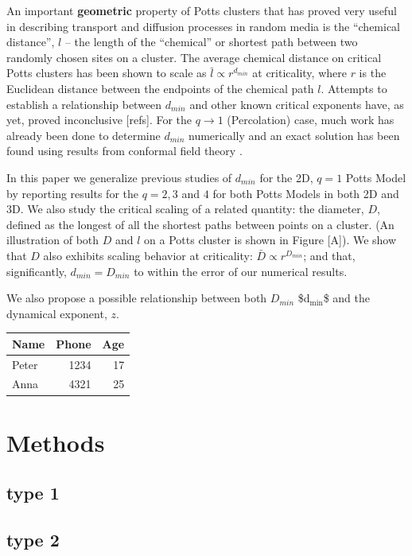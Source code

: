 \documentclass{article}
\begin{document}
An important \textbf{geometric} property of Potts clusters that has proved very useful in describing transport and diffusion processes in random media is the ``chemical distance'', $l$ -- the length of the ``chemical'' or shortest path between two randomly chosen sites on a cluster.  The average chemical distance on critical Potts clusters has been shown to scale as $\bar{l} \propto r^{d_{min}}$ at criticality, where $r$ is the Euclidean distance between the endpoints of the chemical path $l$. Attempts to establish a relationship between $d_{min}$ and other known critical exponents have, as yet, proved inconclusive [refs].  For the $q \to 1$ (Percolation) case, much work has already been done to determine $d_{min}$ numerically \cite{Gr83, HrSt88} and an exact solution has been found using results from conformal field theory \cite{Zi99}.
 
In this paper we generalize previous studies of $d_{min}$ for the 2D, $q=1$ Potts Model by reporting results for the $q = 2, 3$ and $4$ for both Potts Models in both 2D and 3D.  We also study the critical scaling of a related quantity: the diameter, $D$, defined as the longest of all the shortest paths between points on a cluster. (An illustration of both $D$ and $l$ on a Potts cluster is shown in Figure [A]).  We show that $D$ also exhibits scaling behavior at criticality: $\bar{D} \propto r^{D_{min}}$; and that, significantly, $d_{min} = D_{min}$ to within the error of our numerical results.  
 
We also propose a possible relationship between both $D_{min}$ \$d$_{\mathrm{min}}$\$ and the dynamical exponent, $z$.


\begin{center}
\begin{tabular}{lrr}
 Name   &  Phone  &  Age  \\
\hline
 Peter  &   1234  &   17  \\
 Anna   &   4321  &   25  \\
\end{tabular}
\end{center}
\section{Methods}
\label{sec-2}
\subsection{type 1}
\label{sec-2.1}
\subsection{type 2}
\label{sec-2.2}
\end{document}
